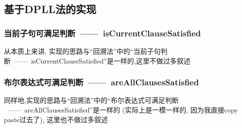    \subsection{基于DPLL法的实现}

        \subsubsection{当前子句可满足判断\ ——\ isCurrentClauseSatisfied}
            从本质上来讲,
            实现的思路与``回溯法''中的``当前子句判断\ ——\ isCurrentClauseSatisfied''是一样的,这里不做过多叙述
        \subsubsection{布尔表达式可满足判断\ ——\ areAllClausesSatisfied}
            同样地,实现的思路与``回溯法''中的``布尔表达式可满足判断
            \ ——\ areAllClausesSatisfied''是一样的
            (实际上是一模一样的,
            因为我直接copy paste过去了),
            这里也不做过多叙述
